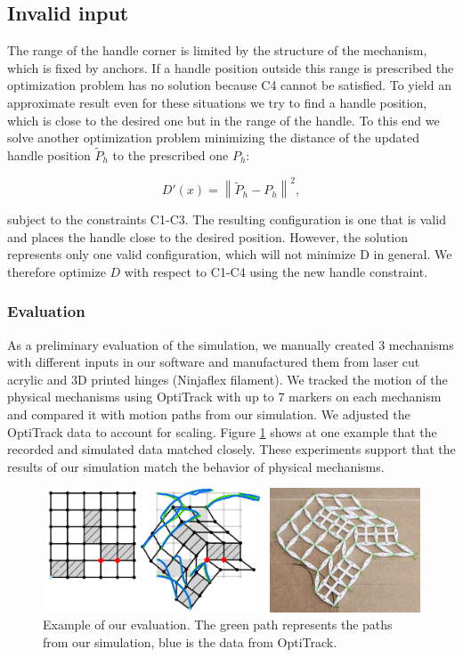 \subsection{Invalid input}

The range of the handle corner is limited by the structure of the mechanism, which is fixed by anchors. If a handle position outside this range is prescribed the optimization problem has no solution because C4 cannot be satisfied. To yield an approximate result even for these situations we try to find a handle position, which is close to the desired one but in the range of the handle. To this end we solve another optimization problem minimizing the distance of the updated handle position ${\widetilde{P}}_h$ to the prescribed one $P_h$:

$$D\prime\left(x\right)=\left \| {\widetilde{P}}_h-P_h \right \|^2,$$

subject to the constraints C1-C3. The resulting configuration is one that is valid and places the handle close to the desired position. However, the solution represents only one valid configuration, which will not minimize D in general. We therefore optimize $D$ with respect to C1-C4 using the new handle constraint.


\subsubsection{Evaluation}

As a preliminary evaluation of the simulation, we manually created 3 mechanisms with different inputs in our software and manufactured them from laser cut acrylic and 3D printed hinges (Ninjaflex filament). We tracked the motion of the physical mechanisms using OptiTrack with up to 7 markers on each mechanism and compared it with motion paths from our simulation. We adjusted the OptiTrack data to account for scaling. Figure \ref{fig:12-optitrack-evaluation} shows at one example that the recorded and simulated data matched closely. These experiments support that the results of our simulation match the behavior of physical mechanisms.

\begin{figure} [h]
    \includegraphics[width=\textwidth]{chapters/understanding-metamaterial-mechanisms-FIG/12-optitrack-evaluation.pdf}
    \caption[Short figure name.]{Example of our evaluation. The green path represents the paths from our simulation, blue is the data from OptiTrack.
    \label{fig:12-optitrack-evaluation}}
\end{figure}


